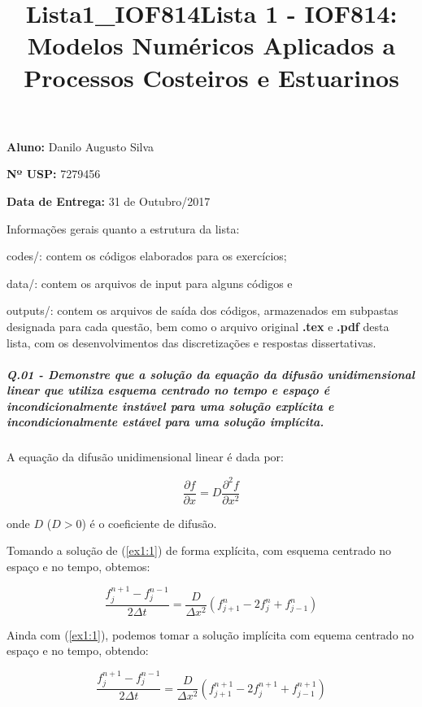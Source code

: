 \documentclass[11pt]{article}
\title{Lista1\_IOF814}
\begin{document}
    

\title{Lista 1 - IOF814: Modelos Numéricos Aplicados a Processos Costeiros e Estuarinos}
\maketitle

\begin{center}
\textbf{Aluno:} Danilo Augusto Silva

\textbf{Nº USP:} 7279456

\textbf{Data de Entrega:} 31 de Outubro/2017
\end{center}
\vspace{0.5in}
Informações gerais quanto a estrutura da lista:

codes/: contem os códigos elaborados para os exercícios;

data/: contem os arquivos de input para alguns códigos e

outputs/: contem os arquivos de saída dos códigos, armazenados em
subpastas designada para cada questão, bem como o arquivo original \textbf{.tex}
e \textbf{.pdf} desta lista, com os desenvolvimentos das discretizações e
respostas dissertativas.

    \subparagraph{Q.01 - Demonstre que a solução da equação da difusão
unidimensional linear que utiliza esquema centrado no tempo e espaço é
incondicionalmente instável para uma solução explícita e
incondicionalmente estável para uma solução
implícita.}
A equação da difusão unidimensional linear é dada por:

\begin{equation}
\frac{\partial{f}}{\partial{x}} = D\frac{\partial^2{f}}{\partial{x^2}}
\label{ex1:1}
\end{equation}

onde \(D\) (\(D > 0\)) é o coeficiente de difusão.

Tomando a solução de (\ref{ex1:1}) de forma explícita, com esquema
centrado no espaço e no tempo, obtemos:

\begin{equation}
\frac{f^{n+1}_{j} - f^{n-1}_{j}}{2\Delta{t}} = \frac{D}{\Delta{x^2}}(f^{n}_{j+1} - 2f^{n}_{j} + f^{n}_{j-1})
\label{ex1:2}
\end{equation}

Ainda com (\ref{ex1:1}), podemos tomar a solução implícita com equema
centrado no espaço e no tempo, obtendo:

\begin{equation}
\frac{f^{n+1}_{j} - f^{n-1}_{j}}{2\Delta{t}} = \frac{D}{\Delta{x^2}}(f^{n+1}_{j+1} - 2f^{n+1}_{j} + f^{n+1}_{j-1})
\label{ex1:3}
\end{equation}
\end{document}
